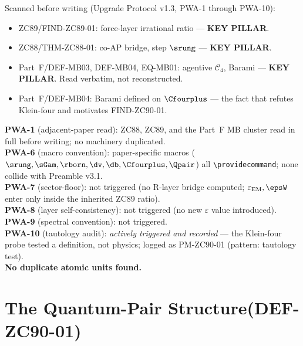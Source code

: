 \documentclass[12pt, a4paper]{article}
\renewcommand{\epsEM}{\varepsilon_{\rm EM}}     %
\begin{document}
\begin{formalbox}[title={Pre-Work Audit Record --- ZC90}]
Scanned before writing (Upgrade Protocol v1.3, PWA-1 through PWA-10):
\begin{itemize}[leftmargin=2em, noitemsep]
  \item ZC89/FIND-ZC89-01: force-layer irrational ratio --- \textbf{KEY PILLAR}.
  \item ZC88/THM-ZC88-01: co-AP bridge, step $\srung$ --- \textbf{KEY PILLAR}.
  \item Part~F/DEF-MB03, DEF-MB04, EQ-MB01: agentive $\mathcal{C}_4$,
    Barami --- \textbf{KEY PILLAR}. Read verbatim, not reconstructed.
  \item Part~F/DEF-MB04: Barami defined on $\Cfourplus$ --- the fact that
    refutes Klein-four and motivates FIND-ZC90-01.
\end{itemize}

\textbf{PWA-1} (adjacent-paper read): ZC88, ZC89, and the Part~F MB
cluster read in full before writing; no machinery duplicated.\\
\textbf{PWA-6} (macro convention): paper-specific macros
($\srung,\sGam,\rborn,\dv,\db,\Cfourplus,\Qpair$) all
\texttt{\textbackslash providecommand}; none collide with Preamble v3.1.\\
\textbf{PWA-7} (sector-floor): not triggered (no R-layer bridge computed;
$\epsEM,\epsW$ enter only inside the inherited ZC89 ratio).\\
\textbf{PWA-8} (layer self-consistency): not triggered (no new
$\varepsilon$ value introduced).\\
\textbf{PWA-9} (spectral convention): not triggered.\\
\textbf{PWA-10} (tautology audit): \emph{actively triggered and recorded}
--- the Klein-four probe tested a definition, not physics; logged as
PM-ZC90-01 (pattern: tautology test).\\
\textbf{No duplicate atomic units found.}
\end{formalbox}

\newpage


\section{The Quantum-Pair Structure\quad(DEF-ZC90-01)}
\label{sec:def-zc90}
\end{document}
